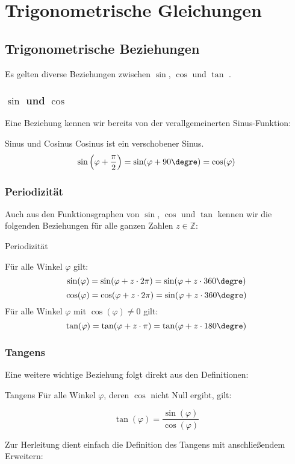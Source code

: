 
\section{Trigonometrische Gleichungen}


\subsection{Trigonometrische Beziehungen}
Es gelten diverse Beziehungen zwischen $\sin$, $\cos$ und $\tan$
.
\subsubsection{$\sin$ und $\cos$}
Eine Beziehung kennen wir bereits von der verallgemeinerten
Sinus-Funktion:

\begin{bemerkung}{Sinus und Cosinus}{}
  Cosinus ist ein verschobener Sinus.
  $$\sin\left(\varphi+\frac{\pi}{2}\right) = \sin(\varphi+90\degre)= \cos(\varphi)$$
\end{bemerkung}

\subsubsection{Periodizität}
Auch aus den Funktionsgraphen von $\sin$, $\cos$ und $\tan$ kennen wir die
folgenden Beziehungen für alle ganzen Zahlen $z\in\mathbb{Z}$:
\begin{bemerkung}{Periodizität}{}


  Für alle Winkel $\varphi$ gilt:
  $$\sin(\varphi) = \sin(\varphi + z\cdot2\pi) = \sin(\varphi + z\cdot360\degre)$$
  $$\cos(\varphi) = \cos(\varphi + z\cdot2\pi) = \sin(\varphi + z\cdot360\degre)$$
  Für alle Winkel $\varphi$ mit $\cos(\varphi)\ne 0$ gilt:
  $$\tan(\varphi) = \tan(\varphi + z\cdot\pi) =\tan(\varphi + z\cdot{}180\degre)$$
  \end{bemerkung}
\newpage

\subsubsection{Tangens}
Eine weitere wichtige Beziehung folgt direkt aus den Definitionen:

\begin{gesetz}{Tangens}{}
  Für alle Winkel $\varphi$, deren $\cos$ nicht Null ergibt, gilt:

  $$\tan(\varphi) = \frac{\sin(\varphi)}{\cos(\varphi)}$$
  \end{gesetz}
Zur Herleitung dient einfach die Definition des Tangens mit
anschließendem Erweitern:


